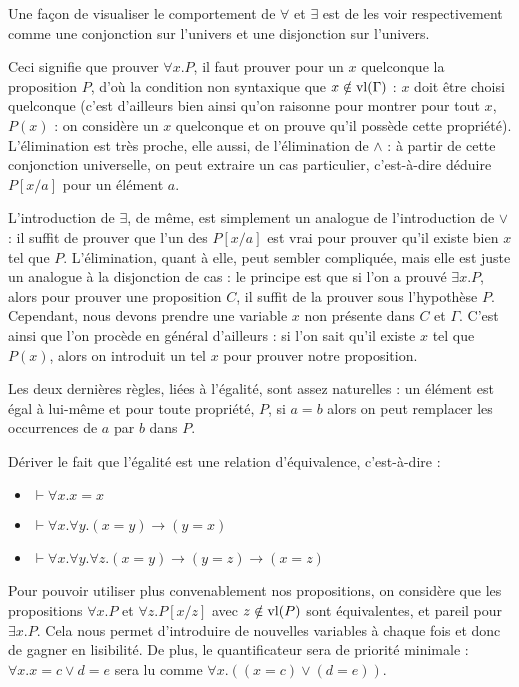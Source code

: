 Une façon de visualiser le comportement de $\forall$ et $\exists$ est de les voir respectivement comme une conjonction sur l'univers et une disjonction sur l'univers.

Ceci signifie que prouver $\forall x.P$, il faut prouver pour un $x$ quelconque la proposition $P$, d'où la condition non syntaxique que $x\notin\mathrm{vl}(\Gamma)$ : $x$ doit être choisi quelconque (c'est d'ailleurs bien ainsi qu'on raisonne pour montrer \og pour tout $x$, $P(x)$\fg{} : on considère un $x$ quelconque et on prouve qu'il possède cette propriété). L'élimination est très proche, elle aussi, de l'élimination de $\land$ : à partir de cette conjonction universelle, on peut extraire un cas particulier, c'est-à-dire déduire $P[x/a]$ pour un élément $a$.

L'introduction de $\exists$, de même, est simplement un analogue de l'introduction de $\lor$ : il suffit de prouver que l'un des $P[x/a]$ est vrai pour prouver qu'il existe bien $x$ tel que $P$. L'élimination, quant à elle, peut sembler compliquée, mais elle est juste un analogue à la disjonction de cas : le principe est que si l'on a prouvé $\exists x.P$, alors pour prouver une proposition $C$, il suffit de la prouver sous l'hypothèse $P$. Cependant, nous devons prendre une variable $x$ non présente dans $C$ et $\Gamma$. C'est ainsi que l'on procède en général d'ailleurs : si l'on sait qu'il existe $x$ tel que $P(x)$, alors on introduit un tel $x$ pour prouver notre proposition.

Les deux dernières règles, liées à l'égalité, sont assez naturelles : un élément est égal à lui-même et pour toute propriété, $P$, si $a=b$ alors on peut remplacer les occurrences de $a$ par $b$ dans $P$.

\begin{exo}\label{exo:releqeg}
    Dériver le fait que l'égalité est une relation d'équivalence, c'est-à-dire :
    \begin{itemize}[label=$\bullet$]
        \item $\vdash \forall x.x=x$
        \item $\vdash \forall x. \forall y. (x=y) \to (y=x)$
        \item $\vdash \forall x. \forall y. \forall z. (x=y) \to (y=z) \to (x=z)$
    \end{itemize}
\end{exo}

\begin{rmk}
    Pour pouvoir utiliser plus convenablement nos propositions, on considère que les propositions $\forall x.P$ et $\forall z.P[x/z]$ avec $z\notin\mathrm{vl}(P)$ sont équivalentes, et pareil pour $\exists x.P$. Cela nous permet d'introduire de nouvelles variables à chaque fois et donc de gagner en lisibilité. De plus, le quantificateur sera de priorité minimale : $\forall x. x=c\lor d=e$ sera lu comme $\forall x. ( (x=c)\lor (d=e))$.
\end{rmk}

